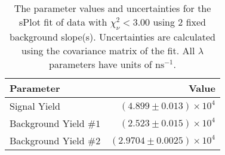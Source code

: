 
\begin{table}
    \begin{center}
        \begin{tabular}{lr}\toprule
            Parameter & Value \\\midrule
            Signal Yield & $(4.899 \pm 0.013) \times 10^{4}$ \\
            Background Yield $\#1$ & $(2.523 \pm 0.015) \times 10^{4}$ \\
            Background Yield $\#2$ & $(2.9704 \pm 0.0025) \times 10^{4}$ \\\bottomrule
        \end{tabular}
        \caption{The parameter values and uncertainties for the sPlot fit of data with $\chi^2_\nu < 3.00$ using 2 fixed background slope(s). Uncertainties are calculated using the covariance matrix of the fit. All $\lambda$ parameters have units of $\si{\nano\second}^{-1}$.}
    \end{center}
\end{table}

